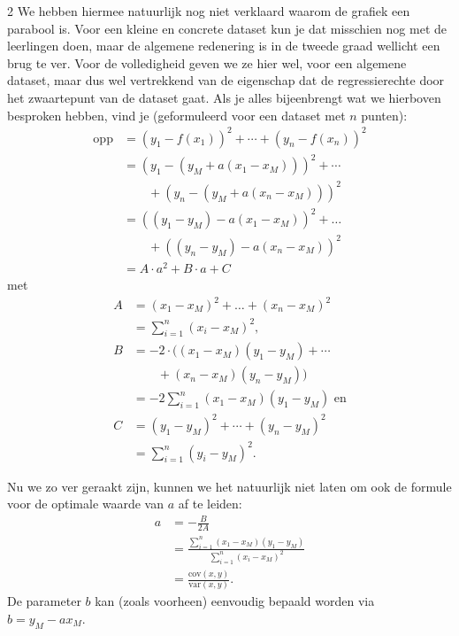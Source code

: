 \begin{multicols}{2}
We hebben hiermee natuurlijk nog niet verklaard waarom de grafiek een parabool is. Voor een kleine en concrete dataset kun je dat misschien nog met de leerlingen doen, maar de algemene redenering is in de tweede graad wellicht een brug te ver. Voor de volledigheid geven we ze hier wel, voor een algemene dataset, maar dus wel vertrekkend van de eigenschap dat de regressierechte door het zwaartepunt van de dataset gaat. Als je alles bijeenbrengt wat we hierboven besproken hebben, vind je (geformuleerd voor een dataset met $n$ punten):
\begin{align*}
\text{opp}	&=\left(y_1-f\left(x_1\right)\right)^2+\cdots+\left(y_n-f\left(x_n\right)\right)^2\\               &=\left(y_1-\left(y_M+a\left(x_1-x_M\right)\right)\right)^2+\cdots\\                          &\qquad  +\left(y_n-\left(y_M+a\left(x_n-x_M\right)\right)\right)^2\\
           &=\left(\left(y_1-y_M\right)-a\left(x_1-x_M\right)\right)^2+\ldots\\
           &\qquad  +\left(\left(y_n-y_M\right)-a\left(x_n-x_M\right)\right)^2\\
           &=A\cdot a^2+B\cdot a+C
\end{align*}
met
\begin{align*}
    A&=\left(x_1-x_M\right)^2+\ldots+\left(x_n-x_M\right)^2\\
    &=\sum_{i=1}^{n}\left(x_i-x_M\right)^2,\\
    B&=-2\cdot\Big(\left(x_1-x_M\right)\left(y_1-y_M\right)+\cdots\\
    &\qquad +\left(x_n-x_M\right)\left(y_n-y_M\right) \Big)\\
    &=-2\sum_{i=1}^{n}{(x_1-x_M)(y_1-y_M)} \text{\ \ \  en}\\
    C&=\left(y_1-y_M\right)^2+\cdots+\left(y_n-y_M\right)^2\\
    &=\sum_{i=1}^{n}\left(y_i-y_M\right)^2.
\end{align*}

Nu we zo ver geraakt zijn, kunnen we het natuurlijk niet laten om ook de formule voor de optimale waarde van $a$ af te leiden:
\begin{align*}
    a&=-\frac{B}{2A}\\
    &=\frac{\sum_{i=1}^{n}\left(x_1-x_M\right)\left(y_1-y_M\right)}{\sum_{i=1}^{n}\left(x_i-x_M\right)^2}\\
    &=\frac{\text{cov}(x,y)}{\text{var}(x,y)}.
\end{align*}
De parameter $b$ kan (zoals voorheen) eenvoudig bepaald worden via $b=y_M-ax_M$.


\end{multicols}
